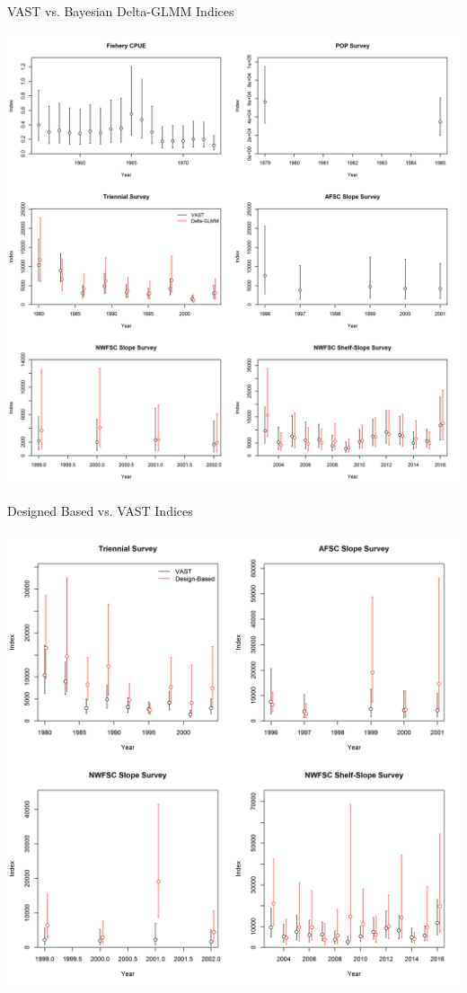 \documentclass[pdf]{beamer}\usepackage[]{graphicx}\usepackage[]{color}
\begin{document}
\begin{frame}{VAST vs. Bayesian Delta-GLMM Indices}
  \begin{center}
    \includegraphics[scale = 0.30]{figures/Index_Comparison.png}
  \end{center}
\end{frame}  

\begin{frame}{Designed Based vs. VAST Indices}
  \begin{center}
    \includegraphics[scale = 0.30]{figures/Index_DesignBased_Comparison.png}
  \end{center}
\end{frame} 
\end{document}
